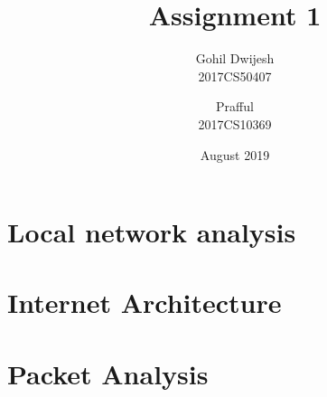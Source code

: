 \documentclass{article}
\title{Assignment 1}
\author{Gohil Dwijesh \\ 2017CS50407
        \and Prafful \\ 2017CS10369}
\date{August 2019}
\begin{document}
\maketitle
\section{Local network analysis}
\section{Internet Architecture}
\section{Packet Analysis}
\end{document}
